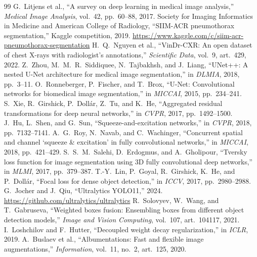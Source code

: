 \documentclass[10pt,twocolumn,letterpaper]{article}
\begin{document}
\begin{thebibliography}{99}
 G.~Litjens et al., ``A survey on deep learning in medical image analysis,'' \emph{Medical Image Analysis}, vol.~42, pp.~60--88, 2017.
 Society for Imaging Informatics in Medicine and American College of Radiology, ``SIIM-ACR pneumothorax segmentation,'' Kaggle competition, 2019. \url{https://www.kaggle.com/c/siim-acr-pneumothorax-segmentation}
 H.~Q.~Nguyen et al., ``VinDr-CXR: An open dataset of chest X-rays with radiologist's annotations,'' \emph{Scientific Data}, vol.~9, art.~429, 2022.
 Z.~Zhou, M.~M.~R.~Siddiquee, N.~Tajbakhsh, and J.~Liang, ``UNet++: A nested U-Net architecture for medical image segmentation,'' in \emph{DLMIA}, 2018, pp.~3--11.
 O.~Ronneberger, P.~Fischer, and T.~Brox, ``U-Net: Convolutional networks for biomedical image segmentation,'' in \emph{MICCAI}, 2015, pp.~234--241.
 S.~Xie, R.~Girshick, P.~Doll{\'a}r, Z.~Tu, and K.~He, ``Aggregated residual transformations for deep neural networks,'' in \emph{CVPR}, 2017, pp.~1492--1500.
 J.~Hu, L.~Shen, and G.~Sun, ``Squeeze-and-excitation networks,'' in \emph{CVPR}, 2018, pp.~7132--7141.
 A.~G.~Roy, N.~Navab, and C.~Wachinger, ``Concurrent spatial and channel `squeeze \& excitation' in fully convolutional networks,'' in \emph{MICCAI}, 2018, pp.~421--429.
 S.~S.~M.~Salehi, D.~Erdogmus, and A.~Gholipour, ``Tversky loss function for image segmentation using 3D fully convolutional deep networks,'' in \emph{MLMI}, 2017, pp.~379--387.
 T.-Y.~Lin, P.~Goyal, R.~Girshick, K.~He, and P.~Doll{\'a}r, ``Focal loss for dense object detection,'' in \emph{ICCV}, 2017, pp.~2980--2988.
 G.~Jocher and J.~Qiu, ``Ultralytics YOLO11,'' 2024. \url{https://github.com/ultralytics/ultralytics}
 R.~Solovyev, W.~Wang, and T.~Gabruseva, ``Weighted boxes fusion: Ensembling boxes from different object detection models,'' \emph{Image and Vision Computing}, vol.~107, art.~104117, 2021.
 I.~Loshchilov and F.~Hutter, ``Decoupled weight decay regularization,'' in \emph{ICLR}, 2019.
 A.~Buslaev et al., ``Albumentations: Fast and flexible image augmentations,'' \emph{Information}, vol.~11, no.~2, art.~125, 2020.
\end{thebibliography}
\end{document}
